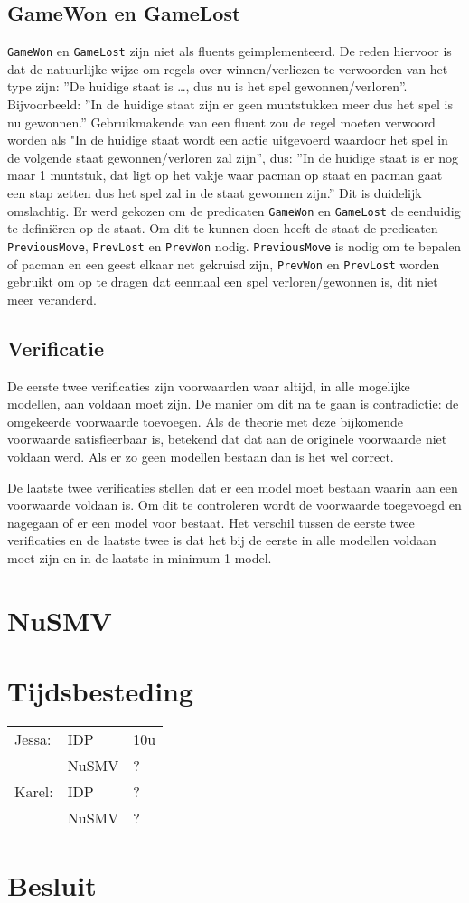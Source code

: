 \documentclass[a4paper,12pt]{article}
\begin{document}
\subsection{GameWon en GameLost}
\texttt{GameWon} en \texttt{GameLost} zijn niet als fluents geimplementeerd. De reden hiervoor is dat de natuurlijke wijze om regels over winnen/verliezen te verwoorden van het type zijn: ''De huidige staat is \dots, dus nu is het spel gewonnen/verloren''. Bijvoorbeeld: ''In de huidige staat zijn er geen muntstukken meer dus het spel is nu gewonnen.'' Gebruikmakende van een fluent zou de regel moeten verwoord worden als "In de huidige staat wordt een actie uitgevoerd waardoor het spel in de volgende staat gewonnen/verloren zal zijn'', dus: ''In de huidige staat is er nog maar 1 muntstuk, dat ligt op het vakje waar pacman op staat en pacman gaat een stap zetten dus het spel zal in de staat gewonnen zijn.'' Dit is duidelijk omslachtig. Er werd gekozen om de predicaten \texttt{GameWon} en \texttt{GameLost} de eenduidig te defini\"eren op de staat. Om dit te kunnen doen heeft de staat de predicaten \texttt{PreviousMove}, \texttt{PrevLost} en \texttt{PrevWon} nodig. \texttt{PreviousMove}  is nodig om te bepalen of pacman en een geest elkaar net gekruisd zijn, \texttt{PrevWon} en \texttt{PrevLost} worden gebruikt om op te dragen dat eenmaal een spel verloren/gewonnen is, dit niet meer veranderd.

\subsection{Verificatie}
De eerste twee verificaties zijn voorwaarden waar altijd, in alle mogelijke modellen, aan voldaan moet zijn. De manier om dit na te gaan is contradictie: de omgekeerde voorwaarde toevoegen. Als de theorie met deze bijkomende voorwaarde satisfieerbaar is, betekend dat dat aan de originele voorwaarde niet voldaan werd. Als er zo geen modellen bestaan dan is het wel correct.

De laatste twee verificaties stellen dat er een model moet bestaan waarin aan een voorwaarde voldaan is. Om dit te controleren wordt de voorwaarde toegevoegd en nagegaan of er een model voor bestaat. Het verschil tussen de eerste twee verificaties en de laatste twee is dat het bij de eerste in alle modellen voldaan moet zijn en in de laatste in minimum 1 model.



\section{NuSMV}

\section{Tijdsbesteding}
\begin{tabular}{l l l}
Jessa: 	& IDP 	& 10u\\
		& NuSMV & ?\\
Karel: 	& IDP 	& ?\\
		& NuSMV & ?\\
\end{tabular}

\section{Besluit}
\end{document}

